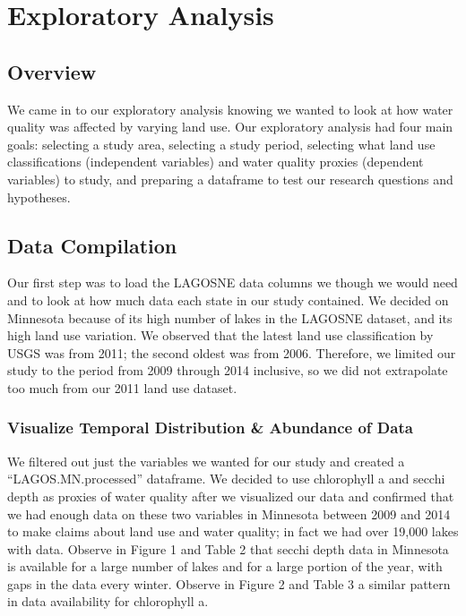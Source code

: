 \documentclass[12pt,]{article}
\begin{document}
\newpage

\hypertarget{exploratory-analysis}{%
\section{Exploratory Analysis}\label{exploratory-analysis}}

\hypertarget{overview}{%
\subsection{Overview}\label{overview}}

We came in to our exploratory analysis knowing we wanted to look at how
water quality was affected by varying land use. Our exploratory analysis
had four main goals: selecting a study area, selecting a study period,
selecting what land use classifications (independent variables) and
water quality proxies (dependent variables) to study, and preparing a
dataframe to test our research questions and hypotheses.

\hypertarget{data-compilation}{%
\subsection{Data Compilation}\label{data-compilation}}

Our first step was to load the LAGOSNE data columns we though we would
need and to look at how much data each state in our study contained. We
decided on Minnesota because of its high number of lakes in the LAGOSNE
dataset, and its high land use variation. We observed that the latest
land use classification by USGS was from 2011; the second oldest was
from 2006. Therefore, we limited our study to the period from 2009
through 2014 inclusive, so we did not extrapolate too much from our 2011
land use dataset.

\hypertarget{visualize-temporal-distribution-abundance-of-data}{%
\subsubsection{Visualize Temporal Distribution \& Abundance of
Data}\label{visualize-temporal-distribution-abundance-of-data}}

We filtered out just the variables we wanted for our study and created a
``LAGOS.MN.processed'' dataframe. We decided to use chlorophyll a and
secchi depth as proxies of water quality after we visualized our data
and confirmed that we had enough data on these two variables in
Minnesota between 2009 and 2014 to make claims about land use and water
quality; in fact we had over 19,000 lakes with data. Observe in Figure 1
and Table 2 that secchi depth data in Minnesota is available for a large
number of lakes and for a large portion of the year, with gaps in the
data every winter. Observe in Figure 2 and Table 3 a similar pattern in
data availability for chlorophyll a.
\end{document}
